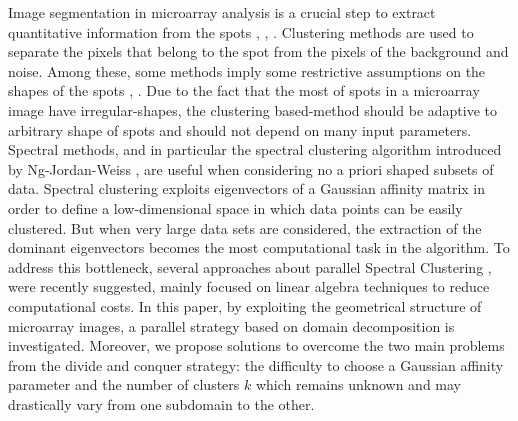 \documentclass[]{svmult}
\begin{document}
Image segmentation in microarray analysis is a crucial step to extract
quantitative information from the spots \cite{rueda2009pattern},
\cite{uslan2010microarray}, \cite{giannakeas2008image}.
Clustering methods are used to separate the pixels that belong to the spot
from the pixels of the background and noise.  Among these, some methods imply
some restrictive  assumptions on the shapes of the spots
\cite{yang2001analysis}, \cite{rueda2005new}.  Due to the fact that the most
of spots in a microarray image have irregular-shapes, the clustering
based-method should be adaptive to arbitrary shape of spots and    should not
depend on many input parameters.  
Spectral methods, and in particular the spectral clustering algorithm
introduced by Ng-Jordan-Weiss \cite{speC}, are  useful when considering no a
priori shaped subsets of data. Spectral clustering exploits eigenvectors of a
Gaussian affinity matrix in order to define a low-dimensional space in which
data points can be easily clustered. But when very large data sets are
considered, the extraction of the dominant eigenvectors becomes the most
computational task in the algorithm. To address this bottleneck, several
approaches about parallel Spectral Clustering \cite{song}, %
\cite{Chen10} were recently suggested, mainly focused on linear  algebra
techniques to reduce computational costs. In this paper, by exploiting the
geometrical structure of microarray images, a parallel strategy based on
domain decomposition is investigated. Moreover, we propose solutions to
overcome the two main problems from the
divide and conquer strategy: the difficulty to choose a Gaussian affinity
parameter and the number of clusters $k$ which remains unknown and may
drastically vary from one subdomain to the other.
    
\end{document}
